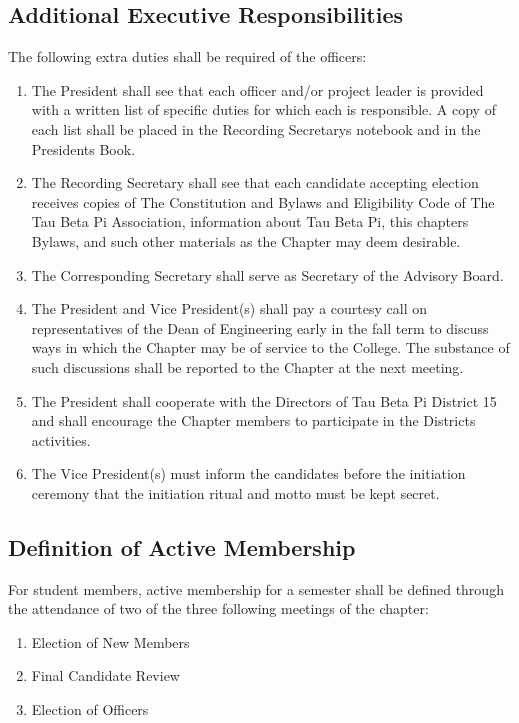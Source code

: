 \documentclass{article}
\begin{document}
	\subsection{Additional Executive Responsibilities}
	The following extra duties shall be required of the officers:
	\begin{enumerate}[\indent (a)]
		\item The President shall see that each officer and/or project leader is provided with a written list of specific duties for which each is responsible. A copy of each list shall be placed in the Recording Secretary\textquotesingle s notebook and in the President\textquotesingle s Book.
		\item The Recording Secretary shall see that each candidate accepting election receives copies of The Constitution and Bylaws and Eligibility Code of The Tau Beta Pi Association, information about Tau Beta Pi, this chapter\textquotesingle s Bylaws, and such other materials as the Chapter may deem desirable.
		\item The Corresponding Secretary shall serve as Secretary of the Advisory Board.
		\item The President and Vice President(s) shall pay a courtesy call on representatives of the Dean of Engineering early in the fall term to discuss ways in which the Chapter may be of service to the College. The substance of such discussions shall be reported to the Chapter at the next meeting. %
		\item The President shall cooperate with the Directors of Tau Beta Pi District 15 and shall encourage the Chapter members to participate in the District\textquotesingle s activities.
		\item The Vice President(s) must inform the candidates before the initiation ceremony that the initiation ritual and motto must be kept secret.
	\end{enumerate}
	\subsection{Definition of Active Membership}
	For student members, active membership for a semester shall be defined through the attendance of two of the three following meetings of the chapter:
	\begin{enumerate}[\indent (a)]
		\item Election of New Members
		\item Final Candidate Review
		\item Election of Officers
	\end{enumerate}
	
\end{document}
